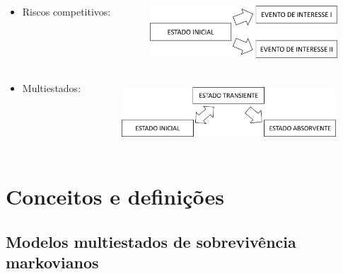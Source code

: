 \begin{frame}
\begin{itemize}
 \pause \item
  \begin{columns}
   \begin{column}{.3\textwidth}
    \begin{center}
     Riscos competitivos:
    \end{center}
   \end{column}
   \begin{column}{.7\textwidth}
    \begin{center}
     \includegraphics*[height = 2cm, width = 7cm]{rc.png}
    \end{center}
   \end{column}
  \end{columns}
\vspace{.25cm}
 \pause \item
  \begin{columns}
   \begin{column}{.2\textwidth}
    \begin{center}
     Multiestados:
    \end{center}
   \end{column}
   \begin{column}{.8\textwidth}
    \begin{center}
     \includegraphics*[height = 2.25cm, width = 8cm]{multi.png}
    \end{center}
   \end{column}
  \end{columns}
\end{itemize}

\end{frame}

\section{Conceitos e definições}\label{conceitos-e-definicoes}

\subsection{Modelos multiestados de sobrevivência
markovianos}\label{modelos-multiestados-de-sobrevivencia-markovianos}

